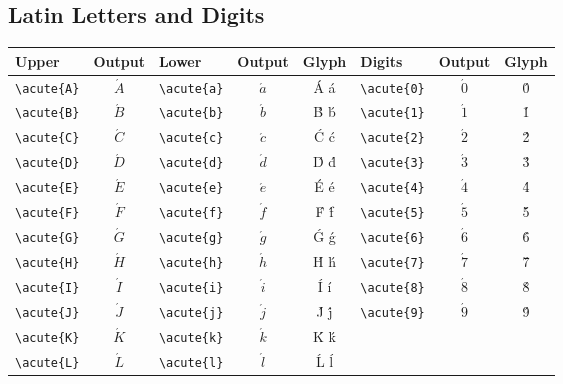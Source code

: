 \documentclass[12pt,a4paper]{article}
\begin{document}
\subsection*{Latin Letters and Digits}
\begin{longtable}{|l|c|l|c|c|l|c|c|}
\hline
\textbf{Upper}     & \textbf{Output} & \textbf{Lower}     & \textbf{Output} & \textbf{Glyph} & \textbf{Digits}  & \textbf{Output} & \textbf{Glyph} \\
\hline
\verb|\acute{A}|   & $\acute{A}$     & \verb|\acute{a}|   & $\acute{a}$     & Á á            & \verb|\acute{0}| & $\acute{0}$     & 0́ \\
\verb|\acute{B}|   & $\acute{B}$     & \verb|\acute{b}|   & $\acute{b}$     & B́ b́            & \verb|\acute{1}| & $\acute{1}$     & 1́ \\
\verb|\acute{C}|   & $\acute{C}$     & \verb|\acute{c}|   & $\acute{c}$     & Ć ć            & \verb|\acute{2}| & $\acute{2}$     & 2́ \\
\verb|\acute{D}|   & $\acute{D}$     & \verb|\acute{d}|   & $\acute{d}$     & D́ d́            & \verb|\acute{3}| & $\acute{3}$     & 3́ \\
\verb|\acute{E}|   & $\acute{E}$     & \verb|\acute{e}|   & $\acute{e}$     & É é            & \verb|\acute{4}| & $\acute{4}$     & 4́ \\
\verb|\acute{F}|   & $\acute{F}$     & \verb|\acute{f}|   & $\acute{f}$     & F́ f́            & \verb|\acute{5}| & $\acute{5}$     & 5́ \\
\verb|\acute{G}|   & $\acute{G}$     & \verb|\acute{g}|   & $\acute{g}$     & Ǵ ǵ            & \verb|\acute{6}| & $\acute{6}$     & 6́ \\
\verb|\acute{H}|   & $\acute{H}$     & \verb|\acute{h}|   & $\acute{h}$     & H́ h́            & \verb|\acute{7}| & $\acute{7}$     & 7́ \\
\verb|\acute{I}|   & $\acute{I}$     & \verb|\acute{i}|   & $\acute{i}$     & Í í            & \verb|\acute{8}| & $\acute{8}$     & 8́ \\
\verb|\acute{J}|   & $\acute{J}$     & \verb|\acute{j}|   & $\acute{j}$     & J́ j́            & \verb|\acute{9}| & $\acute{9}$     & 9́ \\
\verb|\acute{K}|   & $\acute{K}$     & \verb|\acute{k}|   & $\acute{k}$     & Ḱ ḱ            &                  &                 & \\
\verb|\acute{L}|   & $\acute{L}$     & \verb|\acute{l}|   & $\acute{l}$     & Ĺ ĺ            &                  &                 & \\

\end{longtable}
\end{document}
